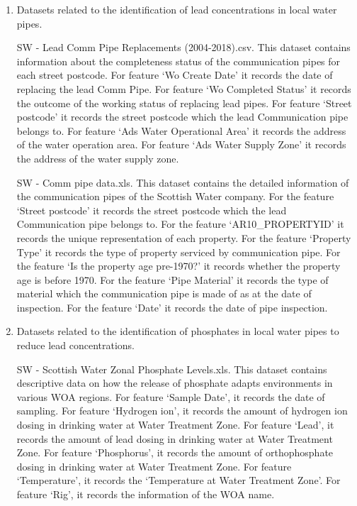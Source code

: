 \documentclass[11pt,twoside]{article}
\numberwithin{Theorem}{section}
\numberwithin{Definition}{section}
\numberwithin{Lemma}{section}
\numberwithin{Algorithm}{section}
\numberwithin{equation}{section}
\begin{document}
\begin{enumerate}

\item Datasets related to the identification of lead concentrations in local water pipes.

SW - Lead Comm Pipe Replacements (2004-2018).csv. This dataset contains information about the completeness status of the communication pipes for each street postcode. For feature ‘Wo Create Date’ it records the date of replacing the lead Comm Pipe. For feature ‘Wo Completed Status’ it records the outcome of the working status of replacing lead pipes. For feature ‘Street postcode’ it records the street postcode which the lead Communication pipe belongs to. For feature ‘Ads Water Operational Area’ it records the address of the water operation area. For feature ‘Ads Water Supply Zone’ it records the address of the water supply zone. 

SW - Comm pipe data.xls. This dataset contains the detailed information of the communication pipes of the Scottish Water company. For the feature ‘Street postcode’ it records the street postcode which the lead Communication pipe belongs to. For the feature ‘AR10\_PROPERTYID’ it records the unique representation of each property. For the feature ‘Property Type’ it records the type of property serviced by communication pipe. For the feature ‘Is the property age pre-1970?’ it records whether the property age is before 1970. For the feature ‘Pipe Material’ it records the type of material which the communication pipe is made of as at the date of inspection. For the feature ‘Date’ it records the date of pipe inspection.

\item Datasets related to the identification of phosphates in local water pipes to reduce lead concentrations.

SW - Scottish Water Zonal Phosphate Levels.xls. This dataset contains descriptive data on how the release of phosphate adapts environments in various WOA regions. For feature ‘Sample Date’, it records the date of sampling. For feature ‘Hydrogen ion’, it records the amount of hydrogen ion dosing in drinking water at Water Treatment Zone. For feature ‘Lead’, it records the amount of lead dosing in drinking water at Water Treatment Zone. For feature ‘Phosphorus’, it records the amount of orthophosphate dosing in drinking water at Water Treatment Zone. For feature ‘Temperature’, it records the ‘Temperature at Water Treatment Zone’. For feature ‘Rig’, it records the information of the WOA name.


\end{enumerate}
\end{document}
